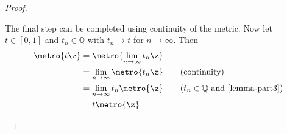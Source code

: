 \begin{proof}

	\begin{proofpart}[$t \metro{\z} = \metro{t \z}$ for $t \in {[0, 1]}$]
		The final step can be completed using continuity of the metric. Now let $t \in [0,1]$ and $t_n \in \mathbb{Q}$ with $t_n \rightarrow t$ for $n \rightarrow \infty$. Then
		\begin{align*}
			\metro{t \z} & = \metro{ \lim_{n \rightarrow \infty } t_n \z }                                                 \\
			            & = \lim_{n \rightarrow \infty } \metro{t_n \z} \tag{continuity}                                  \\
			            & = \lim_{n \rightarrow \infty } t_n \metro{\z} \tag{$t_n \in \mathbb{Q}$ and \cref{lemma-part3}} \\
			            & = t \metro{\z}
		\end{align*}
	\end{proofpart}
\end{proof}
